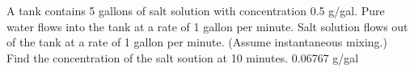 {
A tank contains 5 gallons of salt solution with concentration 0.5 g/gal.  Pure water flows into the tank at a rate of 1 gallon per minute.  Salt solution flows out of the tank at a rate of 1 gallon per minute.  (Assume instantaneous mixing.) Find the concentration of the salt soution at 10 minutes.  
}
{
0.06767 g/gal
}
